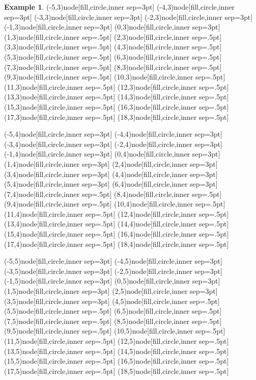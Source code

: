 \documentclass[12pt]{amsart}
\numberwithin{equation}{section}
\theoremstyle{definition}
\newtheorem{example}[equation]{Example}
\begin{document}
\begin{example}
(-5,3)node[fill,circle,inner sep=3pt]{}
(-4,3)node[fill,circle,inner sep=3pt]{}
(-3,3)node[fill,circle,inner sep=3pt]{}
(-2,3)node[fill,circle,inner sep=3pt]{}
(-1,3)node[fill,circle,inner sep=3pt]{}
(0,3)node[fill,circle,inner sep=3pt]{}
(1,3)node[fill,circle,inner sep=.5pt]{}
(2,3)node[fill,circle,inner sep=.5pt]{}
(3,3)node[fill,circle,inner sep=.5pt]{}
(4,3)node[fill,circle,inner sep=.5pt]{}
(5,3)node[fill,circle,inner sep=.5pt]{}
(6,3)node[fill,circle,inner sep=.5pt]{}
(7,3)node[fill,circle,inner sep=.5pt]{}
(8,3)node[fill,circle,inner sep=.5pt]{}
(9,3)node[fill,circle,inner sep=.5pt]{}
(10,3)node[fill,circle,inner sep=.5pt]{}
(11,3)node[fill,circle,inner sep=.5pt]{}
(12,3)node[fill,circle,inner sep=.5pt]{}
(13,3)node[fill,circle,inner sep=.5pt]{}
(14,3)node[fill,circle,inner sep=.5pt]{}
(15,3)node[fill,circle,inner sep=.5pt]{}
(16,3)node[fill,circle,inner sep=.5pt]{}
(17,3)node[fill,circle,inner sep=.5pt]{}
(18,3)node[fill,circle,inner sep=.5pt]{}

(-5,4)node[fill,circle,inner sep=3pt]{}
(-4,4)node[fill,circle,inner sep=3pt]{}
(-3,4)node[fill,circle,inner sep=3pt]{}
(-2,4)node[fill,circle,inner sep=3pt]{}
(-1,4)node[fill,circle,inner sep=3pt]{}
(0,4)node[fill,circle,inner sep=3pt]{}
(1,4)node[fill,circle,inner sep=3pt]{}
(2,4)node[fill,circle,inner sep=3pt]{}
(3,4)node[fill,circle,inner sep=3pt]{}
(4,4)node[fill,circle,inner sep=3pt]{}
(5,4)node[fill,circle,inner sep=3pt]{}
(6,4)node[fill,circle,inner sep=3pt]{}
(7,4)node[fill,circle,inner sep=.5pt]{}
(8,4)node[fill,circle,inner sep=.5pt]{}
(9,4)node[fill,circle,inner sep=.5pt]{}
(10,4)node[fill,circle,inner sep=.5pt]{}
(11,4)node[fill,circle,inner sep=.5pt]{}
(12,4)node[fill,circle,inner sep=.5pt]{}
(13,4)node[fill,circle,inner sep=.5pt]{}
(14,4)node[fill,circle,inner sep=.5pt]{}
(15,4)node[fill,circle,inner sep=.5pt]{}
(16,4)node[fill,circle,inner sep=.5pt]{}
(17,4)node[fill,circle,inner sep=.5pt]{}
(18,4)node[fill,circle,inner sep=.5pt]{}

  
(-5,5)node[fill,circle,inner sep=3pt]{}
(-4,5)node[fill,circle,inner sep=3pt]{}
(-3,5)node[fill,circle,inner sep=3pt]{}
(-2,5)node[fill,circle,inner sep=3pt]{}
(-1,5)node[fill,circle,inner sep=3pt]{}
(0,5)node[fill,circle,inner sep=3pt]{}
(1,5)node[fill,circle,inner sep=3pt]{}
(2,5)node[fill,circle,inner sep=3pt]{}
(3,5)node[fill,circle,inner sep=3pt]{}
(4,5)node[fill,circle,inner sep=.5pt]{}
(5,5)node[fill,circle,inner sep=.5pt]{}
(6,5)node[fill,circle,inner sep=.5pt]{}
(7,5)node[fill,circle,inner sep=.5pt]{}
(8,5)node[fill,circle,inner sep=.5pt]{}
(9,5)node[fill,circle,inner sep=.5pt]{}
(10,5)node[fill,circle,inner sep=.5pt]{}
(11,5)node[fill,circle,inner sep=.5pt]{}
(12,5)node[fill,circle,inner sep=.5pt]{}
(13,5)node[fill,circle,inner sep=.5pt]{}
(14,5)node[fill,circle,inner sep=.5pt]{}
(15,5)node[fill,circle,inner sep=.5pt]{}
(16,5)node[fill,circle,inner sep=.5pt]{}
(17,5)node[fill,circle,inner sep=.5pt]{}
(18,5)node[fill,circle,inner sep=.5pt]{}


\end{example}
\end{document}

